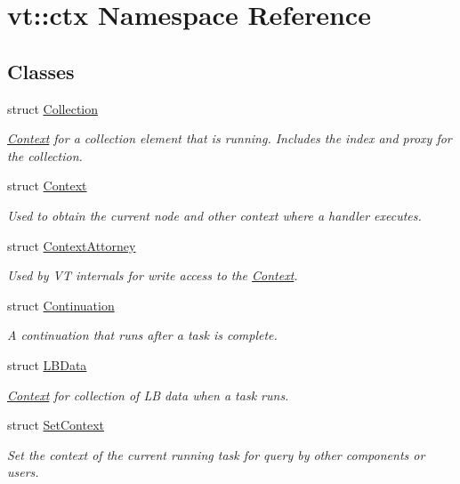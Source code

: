 \hypertarget{namespacevt_1_1ctx}{}\section{vt\+:\+:ctx Namespace Reference}
\label{namespacevt_1_1ctx}
\subsection*{Classes}
\begin{DoxyCompactItemize}
\item 
struct \hyperlink{structvt_1_1ctx_1_1_collection}{Collection}
\begin{DoxyCompactList}\small\item\em \hyperlink{structvt_1_1ctx_1_1_context}{Context} for a collection element that is running. Includes the index and proxy for the collection. \end{DoxyCompactList}\item 
struct \hyperlink{structvt_1_1ctx_1_1_context}{Context}
\begin{DoxyCompactList}\small\item\em Used to obtain the current node and other context where a handler executes. \end{DoxyCompactList}\item 
struct \hyperlink{structvt_1_1ctx_1_1_context_attorney}{Context\+Attorney}
\begin{DoxyCompactList}\small\item\em Used by VT internals for write access to the \hyperlink{structvt_1_1ctx_1_1_context}{Context}. \end{DoxyCompactList}\item 
struct \hyperlink{structvt_1_1ctx_1_1_continuation}{Continuation}
\begin{DoxyCompactList}\small\item\em A continuation that runs after a task is complete. \end{DoxyCompactList}\item 
struct \hyperlink{structvt_1_1ctx_1_1_l_b_data}{L\+B\+Data}
\begin{DoxyCompactList}\small\item\em \hyperlink{structvt_1_1ctx_1_1_context}{Context} for collection of LB data when a task runs. \end{DoxyCompactList}\item 
struct \hyperlink{structvt_1_1ctx_1_1_set_context}{Set\+Context}
\begin{DoxyCompactList}\small\item\em Set the context of the current running task for query by other components or users. \end{DoxyCompactList}\item 

\end{DoxyCompactItemize}
